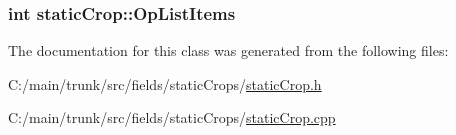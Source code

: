 \label{classstatic_crop_a2c8bc8fdbc9824534c54f9f74a17623e}
\hypertarget{classstatic_crop_af151e77db389d19489ee9d10f6a73628}{
\subsubsection[{OpListItems}]{\setlength{\rightskip}{0pt plus 5cm}int {\bf staticCrop::OpListItems}}}
\label{classstatic_crop_af151e77db389d19489ee9d10f6a73628}


The documentation for this class was generated from the following files:\begin{DoxyCompactItemize}
\item 
C:/main/trunk/src/fields/staticCrops/\hyperlink{static_crop_8h}{staticCrop.h}\item 
C:/main/trunk/src/fields/staticCrops/\hyperlink{static_crop_8cpp}{staticCrop.cpp}\end{DoxyCompactItemize}
